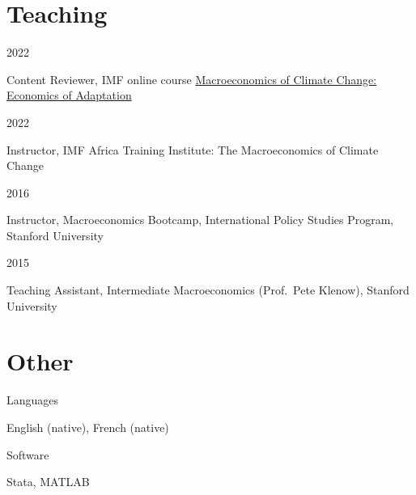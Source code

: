 \documentclass[10pt,a4paper]{article}
\let\oldsection\section
\renewcommand{\section}{\Needspace*{5\baselineskip}\oldsection}
\newlength{\yearw}\setlength{\yearw}{2.35cm}
\newcommand{\entry}[2]{%
  \par\noindent
  \begin{minipage}[t]{\yearw}\strut\color{grey}\small #1\end{minipage}%
  \hspace{0.25cm}%
  \begin{minipage}[t]{\dimexpr\textwidth-\yearw-0.25cm\relax}\strut #2\end{minipage}%
  \par\vspace{4pt}}
\begin{document}
\section*{Teaching}
\entry{2022}{Content Reviewer, IMF online course \href{https://www.imf.org/en/Capacity-Development/Training/ICDTC/Schedule/OL/2022/MCCX-EAOL22-216}{Macroeconomics of Climate Change: Economics of Adaptation}}
\entry{2022}{Instructor, IMF Africa Training Institute: The Macroeconomics of Climate Change}
\entry{2016}{Instructor, Macroeconomics Bootcamp, International Policy Studies Program, Stanford University}
\entry{2015}{Teaching Assistant, Intermediate Macroeconomics (Prof.\ Pete Klenow), Stanford University}

\section*{Other}
\entry{Languages}{English (native), French (native)}
\entry{Software}{Stata, MATLAB}
\end{document}
